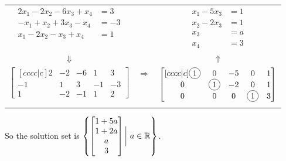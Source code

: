 \begin{applicationActivities}{3}{5}
\begin{example}
\begin{tabular}{ccc}
$\begin{aligned}
2x_1-2x_2-6x_3+x_4 &= 3 \\
-x_1+x_2+3x_3-x_4 &= -3 \\
x_1-2x_2-x_3+x_4 &= 1
\end{aligned}$ & &
$\begin{aligned}
x_1-5x_3 &= 1 \\
x_2-2x_3 &= 1 \\
x_3 &= a \\
x_4 &= 3
\end{aligned}$ \\
$\Downarrow$ & & $\Uparrow$ \\
$\begin{bmatrix}[cccc|c]
{2} & -2 & -6 & 1 & 3 \\
-1 & 1 & 3 & -1 & -3 \\
1 & -2 & -1 & 1 & 2
\end{bmatrix}$  & $\Rightarrow$ & 
$\begin{bmatrix}[cccc|c]
\circledNumber{1} & 0 & -5 & 0 & 1 \\
0 & \circledNumber{1} & -2 & 0  & 1 \\
0 & 0 & 0 & \circledNumber{1} & 3  
\end{bmatrix}$ \\
 & & \\
\end{tabular}

So the solution set is $\left\{\begin{bmatrix} 1+5a \\ 1+2a \\ a \\ 3 \end{bmatrix} \bigg|\ a \in \mathbb{R} \right\}$.
\end{example}





\end{applicationActivities}
